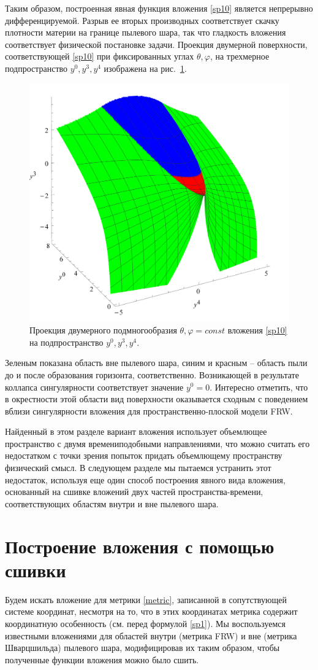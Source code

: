 \documentclass[12pt]{article}
\begin{document}
Таким образом, построенная явная функция вложения \eqref{sp10} является непрерывно дифференцируемой.
Разрыв ее вторых производных соответствует скачку плотности материи на границе пылевого шара, так что гладкость вложения
соответствует физической постановке задачи. Проекция двумерной поверхности, соответствующей \eqref{sp10}
при фиксированных углах $\theta,\varphi$, на трехмерное подпространство $y^0,y^3,y^4$ изображена
на рис.~\ref{pic_emb1}.
\begin{figure}[h!]
\centering
\includegraphics[width=0.55\linewidth]{col_emb-c2.pdf}
\caption{\label{pic_emb1}
Проекция двумерного подмногообразия $\theta,\varphi=const$ вложения \eqref{sp10} на подпространство $y^0,y^3,y^4$.
}
\end{figure}
Зеленым показана область вне пылевого шара, синим и красным -- область пыли до и после образования горизонта, соответственно.
Возникающей в результате коллапса сингулярности соответствует значение $y^0=0$. Интересно отметить, что
в окрестности этой области вид поверхности оказывается сходным с поведением вблизи сингулярности
вложения \cite{robertson1933} для пространственно-плоской модели FRW.

Найденный в этом разделе вариант вложения использует объемлющее пространство с двумя времениподобными направлениями,
что можно считать его недостатком с точки зрения попыток придать объемлющему пространству физический смысл.
В следующем разделе мы пытаемся устранить этот недостаток, используя еще один способ построения явного вида вложения,
основанный на сшивке вложений двух частей пространства-времени, соответствующих областям внутри и вне пылевого шара.


\section{Построение вложения с помощью сшивки}
Будем искать вложение для метрики \eqref{metric}, записанной в сопутствующей системе координат, несмотря на то, что
в этих координатах метрика содержит координатную особенность (см. перед формулой \eqref{sp1}).
Мы воспользуемся известными вложениями для областей внутри (метрика FRW) и вне  (метрика Шварцшильда)
пылевого шара, модифицировав их таким образом, чтобы полученные функции вложения можно было сшить.
\end{document}
